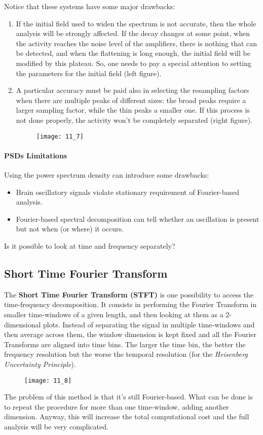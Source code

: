 Notice that these systems have some major drawbacks:
\begin{enumerate}
    \item If the initial field used to widen the spectrum is not accurate, then the whole analysis will be strongly affected. If the decay changes at some point, when the activity reaches the noise level of the amplifiers, there is nothing that can be detected, and when the flattening is long enough, the initial field will be modified by this plateau. So, one needs to pay a special attention to setting the parameters for the initial field (left figure). 
    \item A particular accuracy must be paid also in selecting the resampling factors when there are multiple peaks of different sizes: the broad peaks require a larger sampling factor, while the thin peaks a smaller one. If this process is not done properly, the activity won't be completely separated (right figure). 
\begin{figure}[H]
    \texttt{[image: 11\_7]}
    \centering
\end{figure}
\end{enumerate}

\paragraph{PSDs Limitations}
Using the power spectrum density can introduce some drawbacks:
\begin{itemize}
    \item Brain oscillatory signals violate stationary requirement of Fourier-based analysis.
    \item Fourier-based spectral decomposition can tell whether an oscillation is present but not when (or where) it occurs.
\end{itemize}
\par\medskip
Is it possible to look at time and frequency separately?
\subsection{Short Time Fourier Transform}
The \textbf{Short Time Fourier Transform (STFT)} is one possibility to access the time-frequency decomposition.
It consists in performing the Fourier Transform in smaller time-windows of a given length, and then looking at them as a 
2-dimensional plots. Instead of separating the signal in multiple time-windows and then average across them, the window 
dimension is kept fixed and all the Fourier Transforms are aligned into time bins. The larger the time bin, the better the 
frequency resolution but the worse the temporal resolution (for the \textit{Heisenberg Uncertainty Principle}).
\begin{figure}[H]
    \texttt{[image: 11\_8]}
    \centering
\end{figure}
\par\medskip
The problem of this method is that it's still Fourier-based. What can be done is to repeat the procedure for more than one 
time-window, adding another dimension. Anyway, this will increase the total computational cost and the full analysis will be very 
complicated.

